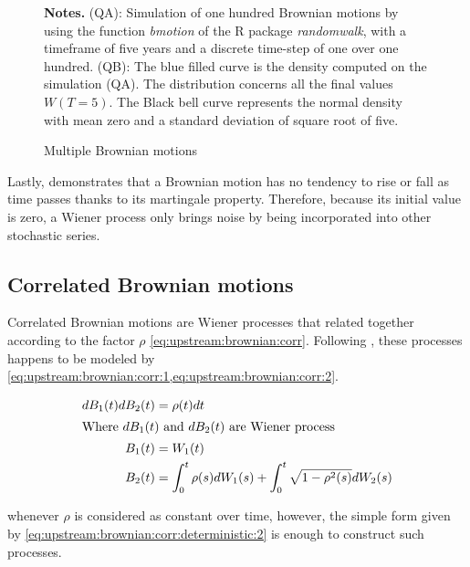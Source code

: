 \documentclass[12pt,a4paper]{report}
\begin{document}
\begin{figure}[H]
\centering

\caption{Multiple Brownian motions}
  \begin{changemargin}{0.5cm}{0.5cm}
  \medskip
\footnotesize
{}\textbf{Notes.} (QA): Simulation of one hundred Brownian motions by using the function \textit{bmotion} of the R package \textit{randomwalk}, with a timeframe of five years and a discrete time-step of one over one hundred.
(QB): The blue filled curve is the density computed on the simulation (QA). The distribution concerns all the final values $W(T = 5)$. The Black bell curve represents the normal density with mean zero and a standard deviation of square root of five.   
\end{changemargin}
\label{fig:upstream:brownian}
\end{figure}

Lastly, \citet{shreve} demonstrates that a Brownian motion has no tendency to rise or fall as time passes thanks to its martingale property. Therefore, because its initial value is zero, a Wiener process only brings noise by being incorporated into other stochastic series.

\subsection{Correlated Brownian motions}
\label{sub:upstream:brownian:correlated}

Correlated Brownian motions are Wiener processes that related together according to the factor $\rho$ \ref{eq:upstream:brownian:corr}.
Following \citet{shreve}, these processes happens to be modeled by \cref{eq:upstream:brownian:corr:1,eq:upstream:brownian:corr:2}.

\begin{align}
  dB_1(t) dB_2(t) &= \rho(t) dt \label{eq:upstream:brownian:corr} \\
  \intertext{Where $dB_1(t)$ and $dB_2(t)$ are Wiener process }
  B_1(t) &= W_1(t) \label{eq:upstream:brownian:corr:1} \\
  B_2(t) &= \int_0^t \rho(s) dW_1(s) + \int_0^t \sqrt{1 - \rho^2(s)} dW_2(s) \label{eq:upstream:brownian:corr:2}
\end{align}

whenever $\rho$ is considered as constant over time, however, the simple form given by  \cref{eq:upstream:brownian:corr:deterministic:2} is enough to construct such processes.
\end{document}
